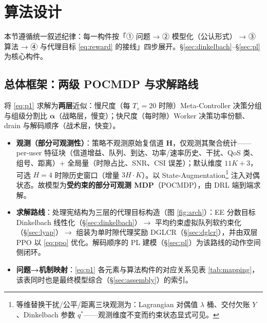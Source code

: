 \documentclass[UTF8,11pt,a4paper]{ctexart}
\theoremstyle{plain}
\theoremstyle{definition}
\theoremstyle{remark}
\newcommand{\vect}[1]{\mathbf{#1}}
\begin{document}
\section{算法设计} \label{sec:algo}

本节遵循统一叙述纪律：每一构件按「① 问题 → ② 模型化（公认形式） → ③ 算法 → ④ 与代理目标 \eqref{eq:reward} 的接线」四步展开。\S\ref{sec:dinkelbach}--\S\ref{sec:pl} 为核心构件。

\subsection{总体框架：两级 POCMDP 与求解路线} \label{sec:overview}

将 \eqref{eq:p1} 求解为\textbf{两层}近似：慢尺度（每 $T_s=20$ 时隙）Meta-Controller 决策分组与组级分割比 $\vect\alpha$（战略层，慢变）；快尺度（每时隙）Worker 决策功率份额、drain 与解码顺序（战术层，快变）。

\begin{itemize}
\item \textbf{观测（部分可观测性）}：策略不观测原始复信道 $\vect H$，仅观测其聚合统计——per-user 特征块（信道增益、队列、到达、功率/速率历史、干扰、QoS 类、组号、距离）$+$ 全局量（时隙占比、SNR、CSI 误差）；默认维度 $11K{+}3$，可选 $H=4$ 时隙历史窗口（增量 $3H\cdot K$）。以 State-Augmentation\footnote{等维替换干扰/公平/距离三块观测为：Lagrangian 对偶值 $\lambda$ 桶、交付欠账 $Y$、Dinkelbach 参数 $q^*$——观测维度不变而约束状态显式可见。} 注入对偶状态。故模型为\textbf{受约束的部分可观测 MDP}（POCMDP），由 DRL 端到端求解。
\item \textbf{求解路线}：处理宪结构为三层的代理目标构造（图 \ref{fig:arch}）：EE 分数目标 Dinkelbach 线性化（\S\ref{sec:dinkelbach}）$\to$ 平均约束虚拟队列软约束化（\S\ref{sec:lyap}）$\to$ 组装为单时隙代理奖励 DGLCR（\S\ref{sec:dglcr}），并由双层 PPO 以 \eqref{eq:ppo} 优化。解码顺序的 PL 建模（\S\ref{sec:pl}）为该路线的动作空间侧闭环。
\item \textbf{问题→机制映射}：\eqref{eq:p1} 各元素与算法构件的对应关系见表 \ref{tab:mapping}，该表同时也是最终模型综合（\S\ref{sec:assembly}）的索引。
\end{itemize}
\end{document}

